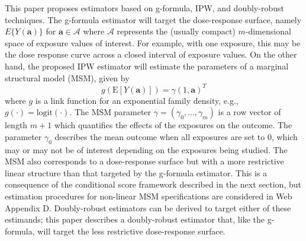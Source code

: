 \documentclass[useAMS,usenatbib,referee]{biom}
\begin{document}
This paper proposes estimators based on g-formula, IPW, and doubly-robust techniques. The g-formula estimator will target the dose-response surface, namely $E\{ Y(\bm{a}) \}$ for $\bm{a} \in \bm{\mathcal{A}}$ where $\bm{\mathcal{A}}$ represents the (usually compact) $m$-dimensional space of exposure values of interest. For example, with one exposure, this may be the dose response curve across a closed interval of exposure values. On the other hand, the proposed IPW estimator will estimate the parameters of a marginal structural model (MSM), given by
\begin{equation}
    g(\text{E}[Y(\bm{a})]) = \gamma (1, \bm{a})^{T}
\end{equation}
where $g$ is a link function for an exponential family density, e.g., $g(\cdot) = \text{logit}(\cdot)$. The MSM parameter $\gamma = (\gamma_{0}, ..., \gamma_{m})$ is a row vector of length $m+1$ which quantifies the effects of the exposures on the outcome. The parameter $\gamma_{0}$ describes the mean outcome when all exposures are set to 0, which may or may not be of interest depending on the exposures being studied. The MSM also corresponds to a dose-response surface but with a more restrictive linear structure than that targeted by the g-formula estimator. This is a consequence of the conditional score framework described in the next section, but estimation procedures for non-linear MSM specifications are considered in Web Appendix D. Doubly-robust estimators can be derived to target either of these estimands; this paper describes a doubly-robust estimator that, like the g-formula, will target the less restrictive dose-response surface.
\end{document}
